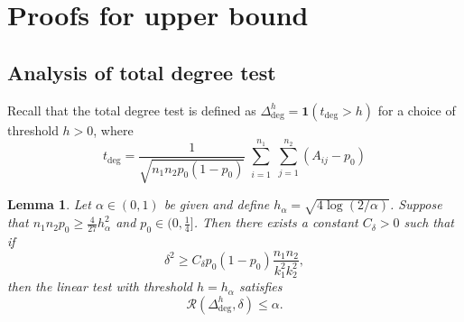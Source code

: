 \documentclass{article}
\newcommand{\cR}{\mathcal{R}}
\newcommand{\one}{\mathbf{1}}
\newcommand{\lin}{\text{deg}}
\newtheorem{lemma}{Lemma}
\begin{document}
\section{Proofs for upper bound}



\subsection{Analysis of total degree test}
Recall that the total degree test is defined as $\Delta_\lin^h = \one(t_\lin > h)$ for a choice of threshold $h > 0$, where
\begin{equation}
        t_{\lin} = \frac{1}{\sqrt{n_1n_2p_0(1-p_0)}}\sum_{\substack{i = 1}}^{n_1}\sum_{j = 1}^{n_2}(A_{ij} - p_0)
\end{equation}
\begin{lemma}\label{lem_linear_test}
    Let $\alpha \in (0,1)$ be given and define $h_\alpha = \sqrt{4 \log(2/\alpha)}$. Suppose that  $n_1n_2p_0 \geq \frac{4}{27}h_\alpha^2$ and $p_0 \in (0,\frac14]$. Then there exists a constant $C_\delta > 0$ such that if
    \[\delta^2 \geq C_\delta p_0(1-p_0)\frac{n_1n_2}{k_1^2k_2^2},\]
    then the linear test with threshold $h = h_\alpha$ satisfies
    \[\cR(\Delta_\lin^h, \delta) \leq \alpha.\]
\end{lemma}
\end{document}
